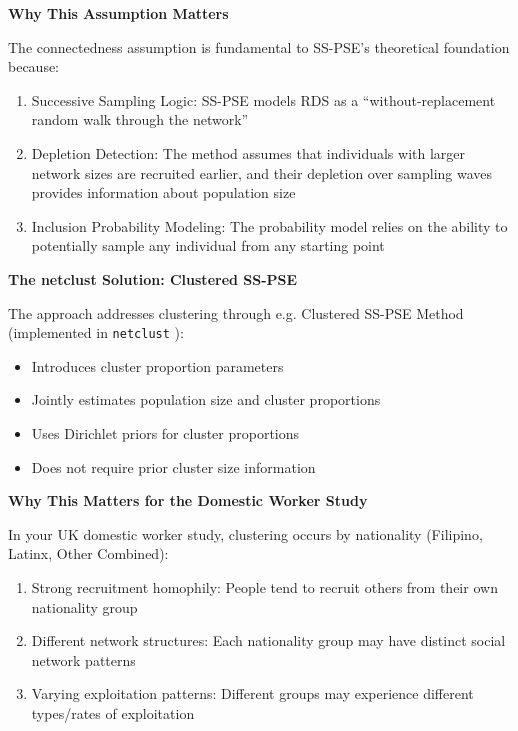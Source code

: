 \documentclass[
  12pt,
  letterpaper,
  DIV=11,
  numbers=noendperiod]{scrartcl}
\providecommand{\tightlist}{%
  \setlength{\itemsep}{0pt}\setlength{\parskip}{0pt}}
\theoremstyle{plain}
\theoremstyle{definition}
\begin{document}
\textbf{Why This Assumption Matters}

The connectedness assumption is fundamental to SS-PSE's theoretical
foundation because:

\begin{enumerate}
\def\labelenumi{\arabic{enumi}.}
\tightlist
\item
  Successive Sampling Logic: SS-PSE models RDS as a
  ``without-replacement random walk through the network''
\item
  Depletion Detection: The method assumes that individuals with larger
  network sizes are recruited earlier, and their depletion over sampling
  waves provides information about population size
\item
  Inclusion Probability Modeling: The probability model relies on the
  ability to potentially sample any individual from any starting point
\end{enumerate}

\textbf{The netclust Solution: Clustered SS-PSE}

The \textcite{gamb23-estimating} approach addresses clustering through
e.g. Clustered SS-PSE Method (implemented in \texttt{netclust}
\textcite{netclust21-ljgamble}):

\begin{itemize}
\tightlist
\item
  Introduces cluster proportion parameters
\item
  Jointly estimates population size and cluster proportions
\item
  Uses Dirichlet priors for cluster proportions
\item
  Does not require prior cluster size information
\end{itemize}

\textbf{Why This Matters for the Domestic Worker Study}

In your UK domestic worker study, clustering occurs by nationality
(Filipino, Latinx, Other Combined):

\begin{enumerate}
\def\labelenumi{\arabic{enumi}.}
\tightlist
\item
  Strong recruitment homophily: People tend to recruit others from their
  own nationality group
\item
  Different network structures: Each nationality group may have distinct
  social network patterns
\item
  Varying exploitation patterns: Different groups may experience
  different types/rates of exploitation
\end{enumerate}
\end{document}
